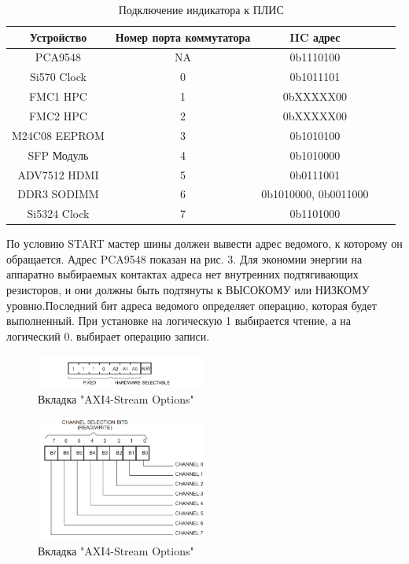 \begin{table}[!ht]
	\begin{center}
		\begin{tabular}{c c c c c}
			\hline\hline
			Устройство & Номер порта коммутатора &  IIC адрес \\
			\hline
			PCA9548 		& NA &	0b1110100  \\
			Si570 Clock 	& 0 & 	0b1011101  \\
			FMC1 HPC 		& 1 & 	0bXXXXX00  \\
			FMC2 HPC 		& 2 & 	0bXXXXX00  \\
			M24C08 EEPROM 	& 3 & 	0b1010100   \\
			SFP Модуль 		& 4 & 	0b1010000   \\
			ADV7512 HDMI 	& 5 & 	0b0111001  \\
			DDR3 SODIMM 	& 6 & 	0b1010000, 0b0011000  \\
			Si5324 Clock 	& 7 & 	0b1101000  \\
			\hline
		\end{tabular}
		\caption{Подключение индикатора к ПЛИС}
		\label{LCD_TO_FPGA}
	\end{center}
\end{table}

По условию START мастер шины должен вывести адрес ведомого, к которому он обращается. Адрес PCA9548 показан на рис. 3. Для экономии энергии на аппаратно выбираемых контактах адреса нет внутренних подтягивающих резисторов, и они должны быть подтянуты к ВЫСОКОМУ или НИЗКОМУ уровню.Последний бит адреса ведомого определяет операцию, которая будет выполненный. При установке на логическую 1 выбирается чтение, а на логический 0.
выбирает операцию записи.

\begin{figure}[h]
	\centering
	\includegraphics[width=0.5\textwidth]{image/PCA9548_addr.png}
	\caption{Вкладка "AXI4-Stream Options"}
	\label{PCA9548_addr.PNG}
\end{figure}

\begin{figure}[h]
	\centering
	\includegraphics[width=0.5\textwidth]{image/PCA9548_CR.png}
	\caption{Вкладка "AXI4-Stream Options"}
	\label{PCA9548_CR.PNG}
\end{figure}


